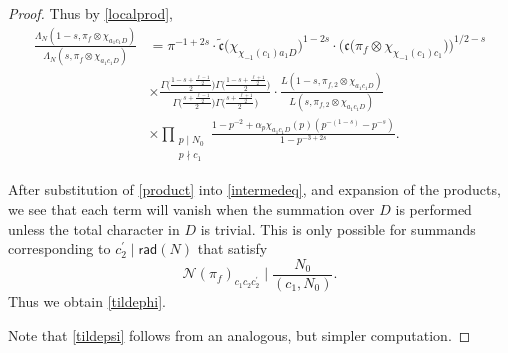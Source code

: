 \documentclass[12pt,reqno]{amsart}
\theoremstyle{plain}
\theoremstyle{remark}
\numberwithin{equation}{section}
\numberwithin{lemma}{section}
\numberwithin{theorem}{section}
\numberwithin{prop}{section}
\numberwithin{remark}{section}
\begin{document}
\begin{proof}
Thus by \eqref{localprod},
\begin{align}
\frac{\Lambda_N(1-s,\pi_f \otimes \chi_{a_1 c_1 D})}{\Lambda_N(s,\pi_f \otimes \chi_{a_1 c_1 D})}
&=\pi^{-1+2s} \cdot \widetilde{\mathfrak{c}} \big( \chi_{\chi_{-1}(c_1) a_1 D} \big)^{1-2s} 
\cdot \big(\mathfrak{c} \big(\pi_f \otimes \chi_{\chi_{-1}(c_1)c_1}) \big)^{1/2-s} \nonumber  \\ 
& \times \frac{\Gamma \Big(\frac{1-s+\frac{\ell-1}{2}}{2} \Big) \Gamma \Big(\frac{1-s+\frac{\ell+1}{2}}{2} \Big)}
{\Gamma \Big(\frac{s+\frac{\ell-1}{2}}{2} \Big) \Gamma \Big(\frac{s+\frac{\ell+1}{2}}{2} \Big)} 
\cdot \frac{L(1-s,\pi_{f,2} \otimes \chi_{a_1 c_1 D})}{L(s,\pi_{f,2} \otimes \chi_{a_1 c_1 D})}
\nonumber \\ 
& \times \prod_{\substack{p \mid N_0 \\ p \nmid c_1 }} 
\frac{1-p^{-2}+\alpha_p \chi_{a_1 c_1 D}(p)(p^{-(1-s)}-p^{-s} ) }{1- p^{-3+2s}}. \label{product}
\end{align}

After substitution of \eqref{product} into \eqref{intermedeq}, and expansion of the products, we see that 
each term will vanish when the summation over $D$ is performed unless the total character in $D$
is trivial. This is only possible for summands corresponding to $c_2^{\prime} \mid \mathsf{rad}(N)$ that
satisfy 
\begin{equation*}
\mathcal{N}(\pi_f)_{c_1 c_2 c_2^{\prime} }  \mid \frac{N_0}{(c_1,N_0)}.
\end{equation*}
Thus we obtain \eqref{tildephi}.

Note that \eqref{tildepsi} follows from an analogous, but simpler computation.
\end{proof}
\end{document}
